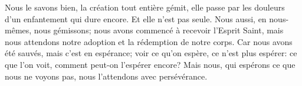 Nous le savons bien, la création tout entière gémit,
	elle passe par les douleurs d’un enfantement qui dure encore.
Et elle n’est pas seule.
	Nous aussi, en nous-mêmes, nous gémissons;
	nous avons commencé à recevoir l’Esprit Saint,
	mais nous attendons notre adoption et la rédemption de notre corps.
Car nous avons été sauvés, mais c’est en espérance;
	voir ce qu’on espère, ce n’est plus espérer:
	ce que l’on voit, comment peut-on l’espérer encore?
Mais nous, qui espérons ce que nous ne voyons pas,
	nous l’attendons avec persévérance.
